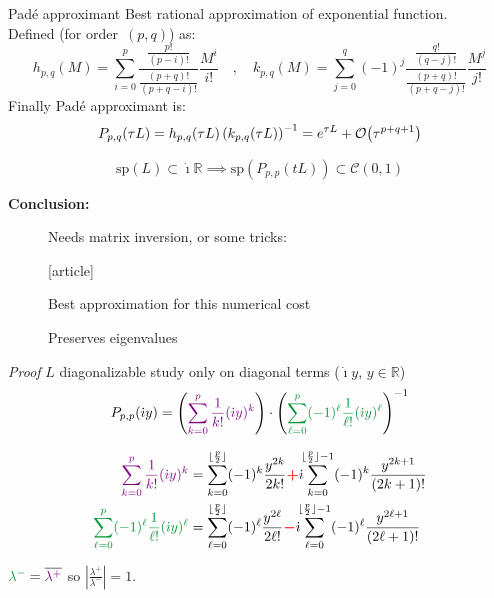 \documentclass{beamer}
\newcommand{\cmark}{{\color{dgreen}\ding{52}}}
\newcommand{\xmark}{{\color{mred}\ding{55}}}
\newcommand{\arrow}{{\color{PLB}\ding{220}}}
\newcommand{\mbold}[1]{{\textbf{\color{PLB}#1}}}
\newcommand{\customcite}[1]{\cite{#1}}
\newcommand{\Mvb}[1]{\boldsymbol{#1}}
\newcommand{\I}{\dot{\imath}}
\begin{document}
\begin{frame}{Padé approximant}
  Best rational approximation of exponential function. \\
  Defined (for order~$(p,q)$) as:
  $$
      h_{p,q}(M) = \sum_{i=0}^p        \frac{\frac{p!}{(p-i)!}}{\frac{(p+q)!}{(p+q-i)!}} \frac{M^i}{i!} \quad,\quad
      k_{p,q}(M) = \sum_{j=0}^q (-1)^j \frac{\frac{q!}{(q-j)!}}{\frac{(p+q)!}{(p+q-j)!}} \frac{M^j}{j!}
  $$
  Finally Padé approximant is:
  $$
    P_{p,q}(\tau L) = h_{p,q}(\tau L)\left( k_{p,q}(\tau L) \right)^{-1} = e^{\tau L} + \order{\tau^{p+q+1}}
  $$
  \vspace{-0.5cm}
  \begin{theorem}
    $$\text{sp}(L)\subset\I\mathbb{R} \implies \text{sp}(P_{p,p}(tL))\subset\mathcal{C}(0,1)$$
  \end{theorem}

  \mbold{Conclusion:}
  \begin{description}
    \item[\xmark] Needs matrix inversion, or some tricks:
      \vspace{-0.1cm}
      \begin{thebibliography}{9}
        [article]
         \customcite{Li:2011}
      \end{thebibliography}
    \item[\cmark] Best approximation for this numerical cost
    \item[\cmark] Preserves eigenvalues
  \end{description}
\end{frame}
\begin{frame}{\emph{Proof}}
  $L$ diagonalizable \arrow{} study only on diagonal terms ($\I y$, $y\in\mathbb{R}$)
  $$
    P_{p,p}(\I y) = \left( \textcolor{violet}{\sum_{k=0}^p \frac{1}{k!}(\I y)^k} \right)\cdot\left(\textcolor{dgreen}{\sum_{\ell=0}^p (-1)^\ell\frac{1}{\ell!}(\I y)^\ell}\right)^{-1}
  $$

  $$
    \begin{aligned}
      \textcolor{violet}{\sum_{k=0}^p \frac{1}{k!}(\I y)^k}                   &= \sum_{k=0}^{\lfloor\frac{p}{2}\rfloor}    (-1)^k\frac{y^{2k}}{{2k}!}          \textcolor{red}{\Mvb{+}}\I\!\!\sum_{k=0}^{\lfloor\frac{p}{2}\rfloor-1} (-1)^k \frac{y^{2k+1}}{(2k+1)!} \\
      \textcolor{dgreen}{\sum_{\ell=0}^p (-1)^\ell\frac{1}{\ell!}(\I y)^\ell} &= \sum_{\ell=0}^{\lfloor\frac{p}{2}\rfloor} (-1)^\ell\frac{y^{2\ell}}{{2\ell}!} \textcolor{red}{\Mvb{-}}\I\!\!\sum_{\ell=0}^{\lfloor\frac{p}{2}\rfloor-1} (-1)^\ell \frac{y^{2\ell+1}}{(2\ell+1)!}
    \end{aligned}
  $$

  $\textcolor{dgreen}{\lambda^-} = \overline{\textcolor{violet}{\lambda^+}}$ so $\left|\frac{\lambda^+}{\lambda^-}\right|=1$.
\end{frame}
\end{document}
